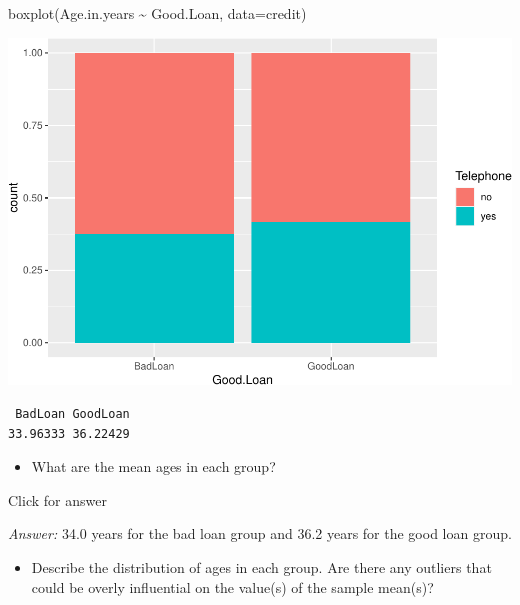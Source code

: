 \documentclass[
]{book}
\newenvironment{Shaded}{\begin{snugshade}}{\end{snugshade}}
\newcommand{\AttributeTok}[1]{\textcolor[rgb]{0.77,0.63,0.00}{#1}}
\newcommand{\FunctionTok}[1]{\textcolor[rgb]{0.00,0.00,0.00}{#1}}
\newcommand{\NormalTok}[1]{#1}
\newcommand{\SpecialCharTok}[1]{\textcolor[rgb]{0.00,0.00,0.00}{#1}}
\providecommand{\tightlist}{%
  \setlength{\itemsep}{0pt}\setlength{\parskip}{0pt}}
\begin{document}
\begin{Shaded}
\begin{Highlighting}[]
\FunctionTok{boxplot}\NormalTok{(Age.in.years }\SpecialCharTok{\textasciitilde{}}\NormalTok{ Good.Loan, }\AttributeTok{data=}\NormalTok{credit)}
\end{Highlighting}
\end{Shaded}

\includegraphics[width=1\linewidth]{Class_Activity_8_files/figure-latex/unnamed-chunk-9-1}

\begin{Shaded}
\end{Shaded}

\begin{verbatim}
 BadLoan GoodLoan 
33.96333 36.22429 
\end{verbatim}

\begin{itemize}
\tightlist
\item
  What are the mean ages in each group?
\end{itemize}

Click for answer

\emph{Answer:} 34.0 years for the bad loan group and 36.2 years for the good loan group.

\begin{itemize}
\tightlist
\item
  Describe the distribution of ages in each group. Are there any outliers that could be overly influential on the value(s) of the sample mean(s)?
\end{itemize}
\end{document}
